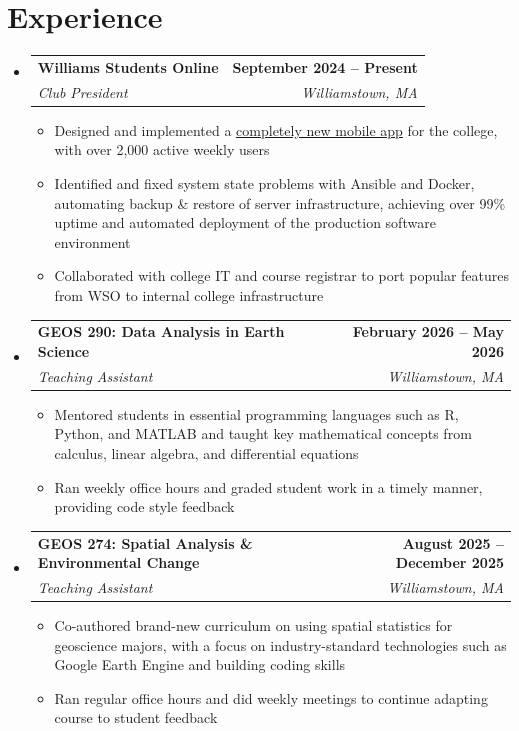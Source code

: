 \documentclass[letterpaper, 11pt]{article}
\makeatletter
\newcommand{\resumeItem}[1]{ \item\small{ {#1 \vspace{-2pt}} } }
\newcommand{\resumeSubheading}[4]{
\vspace{-2pt}
\item
\begin{tabular*}{1.0\textwidth}[t]{l@{\extracolsep{\fill}}r}
	\textbf{#1}       & \textbf{\small #2} \\
	\textit{\small#3} & \textit{\small #4} \\
\end{tabular*}
\vspace{-8pt}
}
\newcommand{\resumeSubHeadingListStart}{\begin{itemize}[leftmargin=0.0in, label={}]}
\newcommand{\resumeSubHeadingListEnd}{\end{itemize}}
\newcommand{\resumeItemListStart}{\vspace{-6pt}\begin{itemize}}
\newcommand{\resumeItemListEnd}{\end{itemize}
\vspace{-6pt}}
\makeatother
\begin{document}
	\section{Experience}
	\resumeSubHeadingListStart

	\resumeSubheading {Williams Students Online}{September 2024 -- Present}
	{Club President}{Williamstown, MA}
        \resumeItemListStart
        \resumeItem{Designed and implemented a \href{https://github.com/nsflores1/wso-mobile}{completely new mobile app} for the college, with over 2,000 active weekly users}
	\resumeItem{Identified and fixed system state problems with Ansible and Docker, automating backup \& restore of server infrastructure, achieving over 99\% uptime and automated deployment of the production software environment}
	\resumeItem{Collaborated with college IT and course registrar to port popular features from WSO to internal college infrastructure}
	\resumeItemListEnd

        \resumeSubheading {GEOS 290: Data Analysis in Earth Science}{February 2026 -- May 2026} {Teaching Assistant}{Williamstown, MA}
        \resumeItemListStart
	\resumeItem{Mentored students in essential programming languages such as R, Python, and MATLAB and taught key mathematical concepts from calculus, linear algebra, and differential equations}
	\resumeItem{Ran weekly office hours and graded student work in a timely manner, providing code style feedback}
	\resumeItemListEnd

	\resumeSubheading {GEOS 274: Spatial Analysis \& Environmental Change}{August 2025 -- December 2025} {Teaching Assistant}{Williamstown, MA}
        \resumeItemListStart
	\resumeItem{Co-authored brand-new curriculum on using spatial statistics for geoscience majors, with a focus on industry-standard technologies such as Google Earth Engine and building coding skills}
	\resumeItem{Ran regular office hours and did weekly meetings to continue adapting course to student feedback}
	\resumeItemListEnd


	\resumeSubHeadingListEnd


\end{document}
